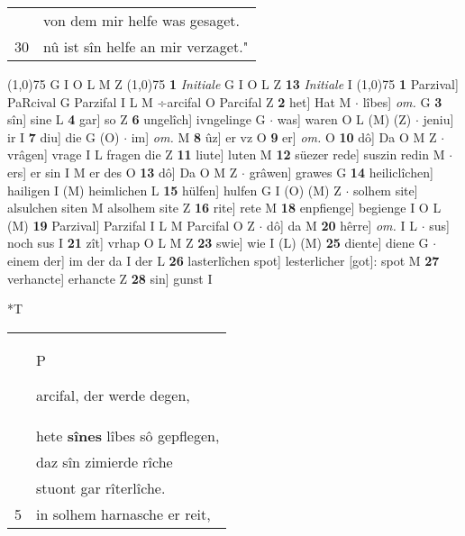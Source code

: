\documentclass[8pt,a4paper,notitlepage]{article}
\begin{document}
\begin{table}[ht]
\begin{minipage}[t]{0.5\linewidth}
\begin{tabular}{rl}
 & von dem mir helfe was gesaget.\\ 
30 & nû ist sîn helfe an mir verzaget."\\ 
\end{tabular}
\scriptsize
\line(1,0){75} \newline
G I O L M Z \newline
\line(1,0){75} \newline
\textbf{1} \textit{Initiale} G I O L Z  \textbf{13} \textit{Initiale} I  \newline
\line(1,0){75} \newline
\textbf{1} Parzival] PaRcival G Parzifal I L M ÷arcifal O Parcifal Z \textbf{2} het] Hat M  $\cdot$ lîbes] \textit{om.} G \textbf{3} sîn] sine L \textbf{4} gar] so Z \textbf{6} ungelîch] ivngelinge G  $\cdot$ was] waren O L (M) (Z)  $\cdot$ jeniu] ir I \textbf{7} diu] die G (O)  $\cdot$ im] \textit{om.} M \textbf{8} ûz] er vz O \textbf{9} er] \textit{om.} O \textbf{10} dô] Da O M Z  $\cdot$ vrâgen] vrage I L fragen die Z \textbf{11} liute] luten M \textbf{12} süezer rede] suszin redin M  $\cdot$ ers] er sin I M er des O \textbf{13} dô] Da O M Z  $\cdot$ grâwen] grawes G \textbf{14} heiliclîchen] hailigen I (M) heimlichen L \textbf{15} hülfen] hulfen G I (O) (M) Z  $\cdot$ solhem site] alsulchen siten M alsolhem site Z \textbf{16} rite] rete M \textbf{18} enpfienge] begienge I O L (M) \textbf{19} Parzival] Parzifal I L M Parcifal O Z  $\cdot$ dô] da M \textbf{20} hêrre] \textit{om.} I L  $\cdot$ sus] noch sus I \textbf{21} zît] vrhap O L M Z \textbf{23} swie] wie I (L) (M) \textbf{25} diente] diene G  $\cdot$ einem der] im der da I der L \textbf{26} lasterlîchen spot] lesterlicher [got]: spot M \textbf{27} verhancte] erhancte Z \textbf{28} sin] gunst I \newline
\end{minipage}
\hspace{0.5cm}
\begin{minipage}[t]{0.5\linewidth}
\small
\begin{center}*T
\end{center}
\begin{tabular}{rl}
 & \begin{large}P\end{large}arcifal, der werde degen,\\ 
 & hete \textbf{sînes} lîbes sô gepflegen,\\ 
 & daz sîn zimierde rîche\\ 
 & stuont gar rîterlîche.\\ 
5 & in solhem harnasche er reit,\\ 

\end{tabular}
\end{minipage}
\end{table}
\end{document}
